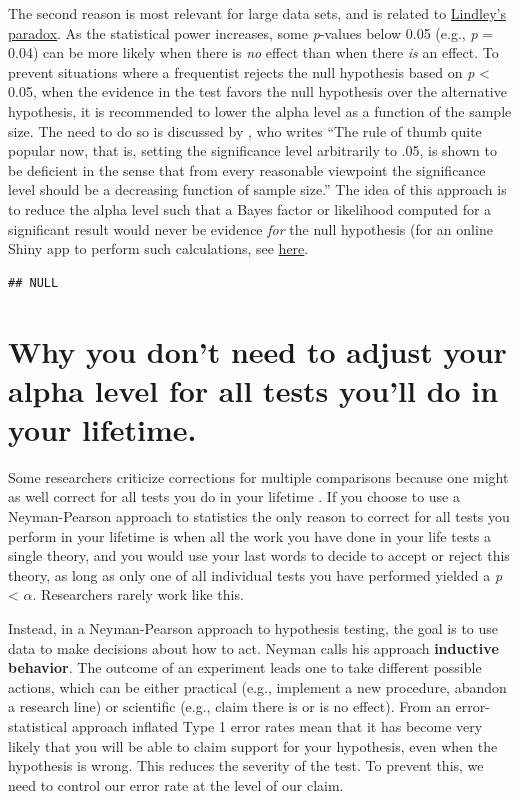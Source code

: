 \documentclass[
  oneside]{krantz}
\begin{document}
The second reason is most relevant for large data sets, and is related to \protect\hyperlink{lindley}{Lindley's paradox}. As the statistical power increases, some \emph{p}-values below 0.05 (e.g., \emph{p} = 0.04) can be more likely when there is \emph{no} effect than when there \emph{is} an effect. To prevent situations where a frequentist rejects the null hypothesis based on \emph{p} \textless{} 0.05, when the evidence in the test favors the null hypothesis over the alternative hypothesis, it is recommended to lower the alpha level as a function of the sample size. The need to do so is discussed by \citet{leamer_specification_1978}, who writes ``The rule of thumb quite popular now, that is, setting the significance level arbitrarily to .05, is shown to be deficient in the sense that from every reasonable viewpoint the significance level should be a decreasing function of sample size.'' The idea of this approach is to reduce the alpha level such that a Bayes factor or likelihood computed for a significant result would never be evidence \emph{for} the null hypothesis (for an online Shiny app to perform such calculations, see \href{https://shiny.ieis.tue.nl/JustifyAlpha/}{here}.

\begin{verbatim}
## NULL
\end{verbatim}

\hypertarget{why-you-dont-need-to-adjust-your-alpha-level-for-all-tests-youll-do-in-your-lifetime.}{%
\section{Why you don't need to adjust your alpha level for all tests you'll do in your lifetime.}\label{why-you-dont-need-to-adjust-your-alpha-level-for-all-tests-youll-do-in-your-lifetime.}}

Some researchers criticize corrections for multiple comparisons because one might as well correct for all tests you do in your lifetime \citep{perneger_whats_1998}. If you choose to use a Neyman-Pearson approach to statistics the only reason to correct for all tests you perform in your lifetime is when all the work you have done in your life tests a single theory, and you would use your last words to decide to accept or reject this theory, as long as only one of all individual tests you have performed yielded a \emph{p} \textless{} \(\alpha\). Researchers rarely work like this.

Instead, in a Neyman-Pearson approach to hypothesis testing, the goal is to use data to make decisions about how to act. Neyman \citeyearpar{neyman_inductive_1957} calls his approach \textbf{inductive behavior}. The outcome of an experiment leads one to take different possible actions, which can be either practical (e.g., implement a new procedure, abandon a research line) or scientific (e.g., claim there is or is no effect). From an error-statistical approach \citep{mayo_statistical_2018} inflated Type 1 error rates mean that it has become very likely that you will be able to claim support for your hypothesis, even when the hypothesis is wrong. This reduces the severity of the test. To prevent this, we need to control our error rate at the level of our claim.
\end{document}
